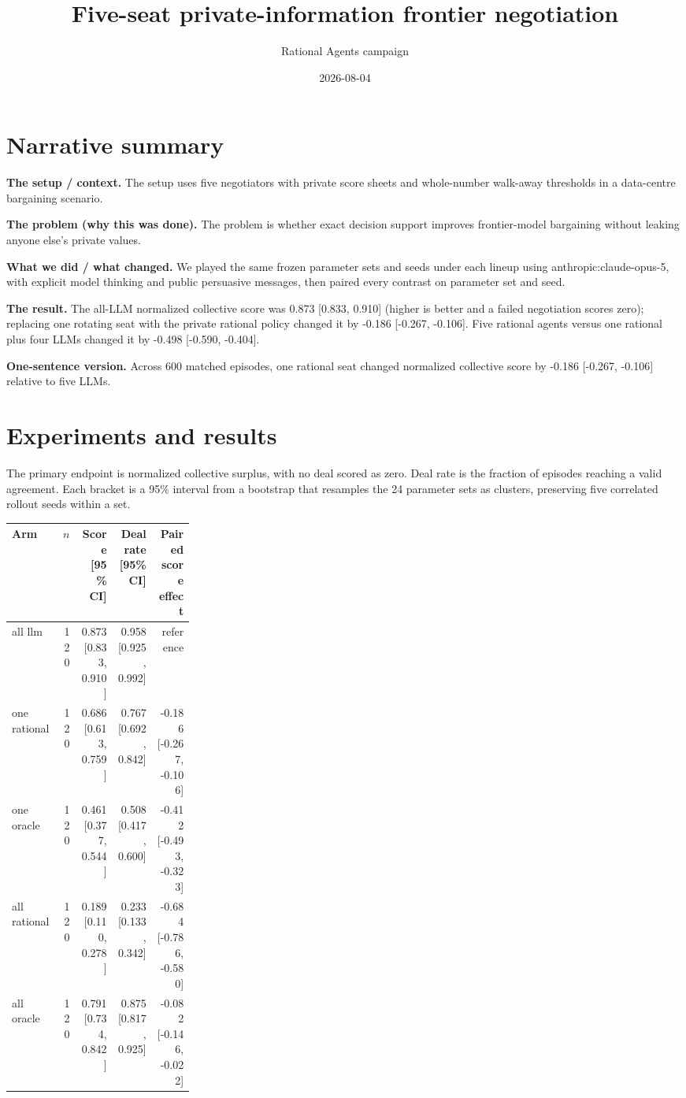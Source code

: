 \documentclass[11pt]{article}
\title{Five-seat private-information frontier negotiation}
\author{Rational Agents campaign}
\date{2026-08-04}
\begin{document}
\maketitle

\section{Narrative summary}
\textbf{The setup / context.} The setup uses five negotiators with private score sheets and whole-number walk-away thresholds in a data-centre bargaining scenario.

\textbf{The problem (why this was done).} The problem is whether exact decision support improves frontier-model bargaining without leaking anyone else's private values. 

\textbf{What we did / what changed.} We played the same frozen parameter sets and seeds under each lineup using anthropic:claude-opus-5, with explicit model thinking and public persuasive messages, then paired every contrast on parameter set and seed. 

\textbf{The result.} The all-LLM normalized collective score was 0.873 [0.833, 0.910] (higher is better and a failed negotiation scores zero); replacing one rotating seat with the private rational policy changed it by -0.186 [-0.267, -0.106]. Five rational agents versus one rational plus four LLMs changed it by -0.498 [-0.590, -0.404].

\textbf{One-sentence version.} Across 600 matched episodes, one rational seat changed normalized collective score by -0.186 [-0.267, -0.106] relative to five LLMs.

\section{Experiments and results}
The primary endpoint is normalized collective surplus, with no deal scored as zero. Deal rate is the fraction
of episodes reaching a valid agreement. Each bracket is a 95\% interval from a bootstrap that resamples the
24 parameter sets as clusters, preserving five correlated rollout seeds within a set.

\begin{longtable}{p{0.27\linewidth}rrrr}
\toprule
Arm & $n$ & Score [95\% CI] & Deal rate [95\% CI] & Paired score effect \\
\midrule
all llm & 120 & 0.873 [0.833, 0.910] & 0.958 [0.925, 0.992] & reference \\
one rational & 120 & 0.686 [0.613, 0.759] & 0.767 [0.692, 0.842] & -0.186 [-0.267, -0.106] \\
one oracle & 120 & 0.461 [0.377, 0.544] & 0.508 [0.417, 0.600] & -0.412 [-0.493, -0.323] \\
all rational & 120 & 0.189 [0.110, 0.278] & 0.233 [0.133, 0.342] & -0.684 [-0.786, -0.580] \\
all oracle & 120 & 0.791 [0.734, 0.842] & 0.875 [0.817, 0.925] & -0.082 [-0.146, -0.022] \\
\bottomrule
\end{longtable}
\end{document}
